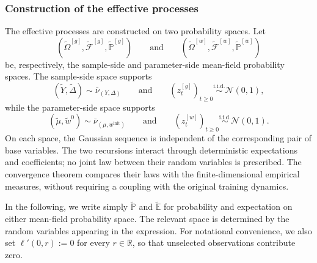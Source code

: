 \subsubsection{Construction of the effective processes}

The effective processes are constructed on two probability spaces. Let
\[
    (\tilde\Omega^{[g]},\tilde{\mathcal F}^{[g]},
        \tilde{\mathbb P}^{[g]})
    \qquad\text{and}\qquad
    (\tilde\Omega^{[w]},\tilde{\mathcal F}^{[w]},
        \tilde{\mathbb P}^{[w]})
\]
be, respectively, the sample-side and parameter-side mean-field
probability spaces. The sample-side space supports
\[
    (\tilde Y,\tilde\Delta)\sim\bar\nu_{(Y,\Delta)}
    \qquad\text{and}\qquad
    (z_t^{[g]})_{t\geq0}
    \stackrel{\mathrm{i.i.d.}}{\sim}\mathcal N(0,1),
\]
while the parameter-side space supports
\[
    (\tilde\mu,\tilde w^0)
    \sim\bar\nu_{(\mu,w^{\mathrm{init}})}
    \qquad\text{and}\qquad
    (z_t^{[w]})_{t\geq0}
    \stackrel{\mathrm{i.i.d.}}{\sim}\mathcal N(0,1).
\]
On each space, the Gaussian sequence is independent of the
corresponding pair of base variables.
The two recursions interact through deterministic expectations
and coefficients; no joint law between their random variables
is prescribed. The convergence theorem compares their laws
with the finite-dimensional empirical measures, without requiring
a coupling with the original training dynamics.

In the following, we write simply $\tilde{\mathbb P}$ and
$\tilde{\mathbb E}$ for probability and expectation on either
mean-field probability space. The relevant space is determined by
the random variables appearing in the expression. For notational convenience, we also set $\ell'(0,r):=0$ for every
$r\in\mathbb R$, so that unselected observations contribute zero.


